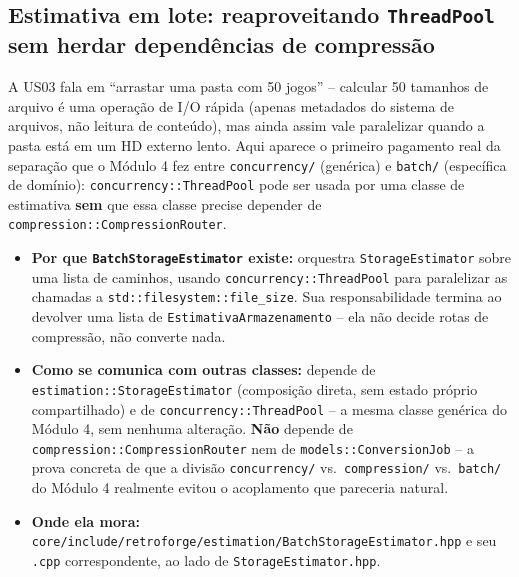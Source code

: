 \subsection{Estimativa em lote: reaproveitando \texttt{ThreadPool} sem herdar dependências de compressão}
\label{sec:batch-estimator}

A US03 fala em ``arrastar uma pasta com 50 jogos'' -- calcular 50 tamanhos de arquivo é uma operação de I/O rápida (apenas metadados do sistema de arquivos, não leitura de conteúdo), mas ainda assim vale paralelizar quando a pasta está em um HD externo lento. Aqui aparece o primeiro pagamento real da separação que o Módulo 4 fez entre \texttt{concurrency/} (genérica) e \texttt{batch/} (específica de domínio): \texttt{concurrency::ThreadPool} pode ser usada por uma classe de estimativa \textbf{sem} que essa classe precise depender de \texttt{compression::CompressionRouter}.

\begin{itemize}
    \item \textbf{Por que \texttt{BatchStorageEstimator} existe:} orquestra \texttt{StorageEstimator} sobre uma lista de caminhos, usando \texttt{concurrency::ThreadPool} para paralelizar as chamadas a \texttt{std::filesystem::file\_size}. Sua responsabilidade termina ao devolver uma lista de \texttt{EstimativaArmazenamento} -- ela não decide rotas de compressão, não converte nada.
    \item \textbf{Como se comunica com outras classes:} depende de \texttt{estimation::StorageEstimator} (composição direta, sem estado próprio compartilhado) e de \texttt{concurrency::ThreadPool} -- a mesma classe genérica do Módulo 4, sem nenhuma alteração. \textbf{Não} depende de \texttt{compression::CompressionRouter} nem de \texttt{models::ConversionJob} -- a prova concreta de que a divisão \texttt{concurrency/} vs.\ \texttt{compression/} vs.\ \texttt{batch/} do Módulo 4 realmente evitou o acoplamento que pareceria natural.
    \item \textbf{Onde ela mora:} \texttt{core/include/retroforge/estimation/BatchStorageEstimator.hpp} e seu \texttt{.cpp} correspondente, ao lado de \texttt{StorageEstimator.hpp}.
\end{itemize}

